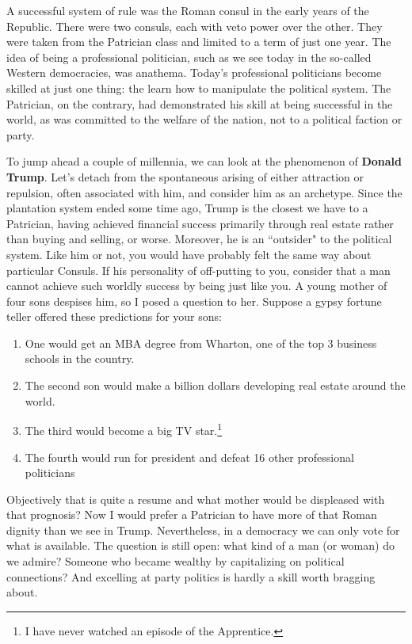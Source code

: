 A successful system of rule was the Roman consul in the early years of the Republic. There were two consuls, each with veto power over the other. They were taken from the Patrician class and limited to a term of just one year. The idea of being a professional politician, such as we see today in the so-called Western democracies, was anathema. Today's professional politicians become skilled at just one thing: the learn how to manipulate the political system. The Patrician, on the contrary, had demonstrated his skill at being successful in the world, as was committed to the welfare of the nation, not to a political faction or party.

To jump ahead a couple of millennia, we can look at the phenomenon of \textbf{Donald Trump}. Let's detach from the spontaneous arising of either attraction or repulsion, often associated with him, and consider him as an archetype. Since the plantation system ended some time ago, Trump is the closest we have to a Patrician, having achieved financial success primarily through real estate rather than buying and selling, or worse. Moreover, he is an ``outsider" to the political system. Like him or not, you would have probably felt the same way about particular Consuls. If his personality of off-putting to you, consider that a man cannot achieve such worldly success by being just like you. A young mother of four sons despises him, so I posed a question to her. Suppose a gypsy fortune teller offered these predictions for your sons:

\begin{enumerate}
\item One would get an MBA degree from Wharton, one of the top 3 business schools in the country. 
\item The second son would make a billion dollars developing real estate around the world. 
\item The third would become a big TV star.\footnote{I have never watched an episode of the Apprentice.}
\item The fourth would run for president and defeat 16 other professional politicians 
\end{enumerate}
Objectively that is quite a resume and what mother would be displeased with that prognosis? Now I would prefer a Patrician to have more of that Roman dignity than we see in Trump. Nevertheless, in a democracy we can only vote for what is available. The question is still open: what kind of a man (or woman) do we admire? Someone who became wealthy by capitalizing on political connections? And excelling at party politics is hardly a skill worth bragging about.

